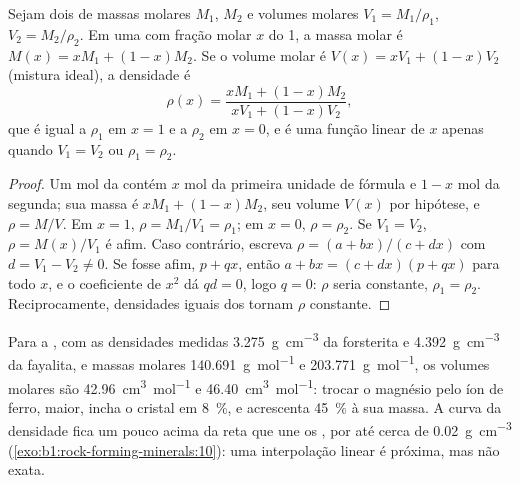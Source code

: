 \begin{proposition}\label{prop:b1:rock-forming-minerals:ideal-mixing}
Sejam dois  de massas molares $M_1$, $M_2$ e volumes molares
$V_1 = M_1/\rho_1$, $V_2 = M_2/\rho_2$. Em uma  com fração molar $x$ do  1, a massa molar é
$M(x) = x M_1 + (1 - x) M_2$. Se o volume molar é
$V(x) = x V_1 + (1 - x) V_2$ (mistura ideal), a densidade é
\[
  \rho(x) = \frac{x M_1 + (1 - x) M_2}{x V_1 + (1 - x) V_2},
\]
que é igual a $\rho_1$ em $x = 1$ e a $\rho_2$ em $x = 0$, e é uma função linear de $x$ apenas quando $V_1 = V_2$ ou $\rho_1 = \rho_2$.
\end{proposition}

\begin{proof}
Um mol da  contém $x$ mol da primeira unidade de fórmula e $1 - x$ mol da segunda; sua massa é $x M_1 + (1 - x) M_2$, seu volume $V(x)$ por hipótese, e $\rho = M/V$. Em $x = 1$, $\rho = M_1/V_1 = \rho_1$;
em $x = 0$, $\rho = \rho_2$. Se $V_1 = V_2$, $\rho = M(x)/V_1$ é afim.
Caso contrário, escreva $\rho = (a + bx)/(c + dx)$ com $d = V_1 - V_2 \ne 0$. Se fosse afim,
$p + qx$, então $a + bx = (c + dx)(p + qx)$ para todo $x$, e o coeficiente de $x^2$ dá $qd = 0$, logo $q = 0$: $\rho$ seria constante,
$\rho_1 = \rho_2$. Reciprocamente, densidades iguais dos  tornam $\rho$ constante.
\end{proof}

Para a , com as densidades medidas \qty{3.275}{g.cm^{-3}} da forsterita e \qty{4.392}{g.cm^{-3}} da fayalita, e massas molares \qty{140.691}{g.mol^{-1}} e \qty{203.771}{g.mol^{-1}}, os volumes molares são \qty{42.96}{cm^3.mol^{-1}} e \qty{46.40}{cm^3.mol^{-1}}: trocar o magnésio pelo íon de ferro, maior, incha o cristal em \qty{8}{\percent}, e acrescenta \qty{45}{\percent} à sua massa. A curva da densidade fica um pouco acima da reta que une os , por até cerca de \qty{0.02}{g.cm^{-3}} (\cref{exo:b1:rock-forming-minerals:10}): uma interpolação linear é próxima, mas não exata.


